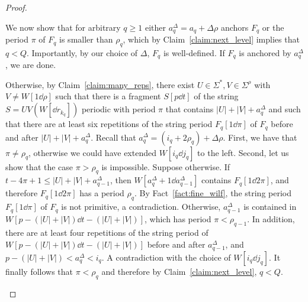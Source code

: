 \begin{proof}
\begin{enumerate}[label=\textrm{(\alph*)}]
We now show that for arbitrary $q \ge 1$ either $a_q^\Delta = a_q + \Delta \rho$ anchors $F_q$ or the period $\pi$ of $F_q$ is smaller than $\rho_q$, which by Claim~\ref{claim:next_level} implies that $q < Q$. Importantly, by our choice of $\Delta$, $F_q$ is well-defined.  If $F_q$ is anchored by $a_q^\Delta$, we are done.  

Otherwise, by Claim~\ref{claim:many_reps}, there exist $U \in \Sigma^\ast, V \in \Sigma^\rho$ with $V \neq W[1 \dd \rho]$ such that there is a fragment $S[p \dd t]$ of the string $S = UV(W[\dd r_{k_q}])$ periodic with period $\pi$ that contains $|U|+|V|+a_q^\Delta$ and such that there are at least six repetitions of the string period $F_q[1\dd \pi]$ of $F_q$ before and after $|U|+|V|+a_q^\Delta$. Recall that $a_q^\Delta = (i_q+2\rho_q) + \Delta \rho$. First, we have that $\pi \neq \rho_q$, otherwise we could have extended $W[i_q \dd j_q]$ to the left. Second, let us show that the case $\pi > \rho_q$ is impossible. Suppose otherwise. If $t-4\pi+1 \le |U|+|V|+a_{q-1}^\Delta$, then $W[a_q^\Delta+1 \dd a_{q-1}^\Delta]$ contains $F_q[1\dd 2\pi]$, and therefore $F_q[1\dd 2\pi]$ has a period $\rho_q$. By Fact~\ref{fact:fine_wilf}, the string period $F_q[1\dd \pi]$ of $F_q$ is not primitive, a contradiction. Otherwise, $a_{q-1}^\Delta$ is contained in $W[p-(|U|+|V|) \dd t-(|U|+|V|)]$, which has period $\pi < \rho_{q-1}$. In addition, there are at least four repetitions of the string period of $W[p-(|U|+|V|) \dd t-(|U|+|V|)]$ before and after $a_{q-1}^\Delta$, and $p-(|U|+|V|) < a_q^\Delta < i_q$. A contradiction with the choice of $W[i_q \dd j_q]$. It finally follows that $\pi < \rho_q$ and therefore by Claim~\ref{claim:next_level}, $q < Q$.



\end{enumerate}
\end{proof}
